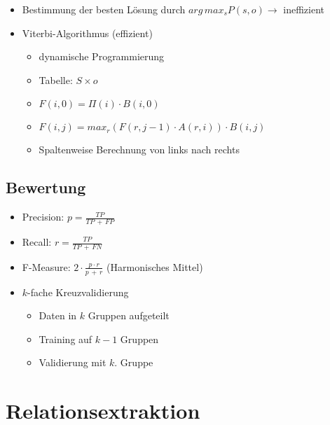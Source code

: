 \documentclass[nonacm=true, language=german]{acmart}
\begin{document}
\begin{itemize}
    \item Bestimmung der besten Lösung durch $ arg \, max_s P(s, o) \rightarrow $ ineffizient
    \item Viterbi-Algorithmus (effizient)
    \begin{itemize}
        \item dynamische Programmierung
        \item Tabelle: $ S \times o $
        \item $ F(i, 0) = \Pi(i) \cdot B(i, 0) $
        \item $ F(i, j) = max_r(F(r, j-1) \cdot A(r, i)) \cdot B(i, j) $
        \item Spaltenweise Berechnung von links nach rechts
    \end{itemize}
\end{itemize}

\subsection{Bewertung}

\begin{itemize}
    \item Precision: $ p = \frac{TP}{TP \, + \, FP} $
    \item Recall: $ r = \frac{TP}{TP \, + \, FN} $
    \item F-Measure: $ 2 \cdot \frac{p \cdot r}{p \, + \, r} $ (Harmonisches Mittel)
    \item $k$-fache Kreuzvalidierung
    \begin{itemize}
        \item Daten in $k$ Gruppen aufgeteilt
        \item Training auf $k-1$ Gruppen
        \item Validierung mit $k.$ Gruppe
    \end{itemize}
\end{itemize}

\newpage
\section{Relationsextraktion}
\end{document}
